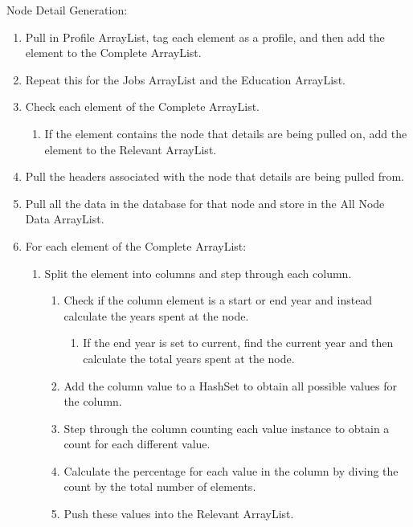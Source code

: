 \begin{description}
    \item[Node Detail Generation:]
\end{description}
\begin{enumerate}
  \item Pull in Profile ArrayList, tag each element as a profile, and then add
  the element to the Complete ArrayList.
  \item Repeat this for the Jobs ArrayList and the Education ArrayList.
  \item Check each element of the Complete ArrayList.
  \begin{enumerate}
    \item If the element contains the node that details are being pulled on, add
    the element to the Relevant ArrayList.
  \end{enumerate}
  \item Pull the headers associated with the node that details are being pulled
  from.
  \item Pull all the data in the database for that node and store in the All
  Node Data ArrayList.
  \item For each element of the Complete ArrayList:
  \begin{enumerate}
    \item Split the element into columns and step through each column.
    \begin{enumerate}
    	\item Check if the column element is a start or end year and instead
    	calculate the years spent at the node.
    	\begin{enumerate}
    	  \item If the end year is set to current, find the current year and then
    	  calculate the total years spent at the node.
    	\end{enumerate}
    	\item Add the column value to a HashSet to obtain all possible values for
    	the column.
    	\item Step through the column counting each value instance to obtain a
    	count for each different value.
    	\item Calculate the percentage for each value in the column by diving the
    	count by the total number of elements.
    	\item Push these values into the Relevant ArrayList.
    \end{enumerate} 
  \end{enumerate}

\end{enumerate}
